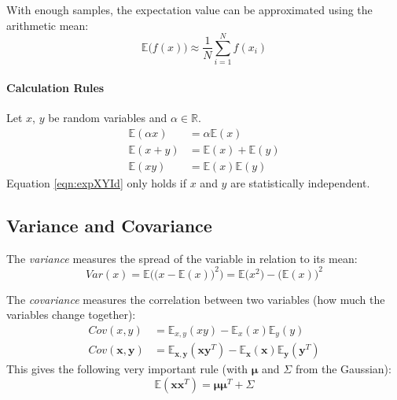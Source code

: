 \documentclass[a4paper, 11pt, accentcolor = tud3b]{tudreport}
\newcommand{\E}{\ensuremath{\mathbb{E}}}
\newcommand{\Cov}{\ensuremath{\textit{Cov}}}
\newcommand{\R}{\ensuremath{\mathbb{R}}}
\newcommand{\Var}{\ensuremath{\textit{Var}}}
\renewcommand{\vec}[1]{\mathbf{#1}}
\begin{document}
				With enough samples, the expectation value can be approximated using the arithmetic mean:
				\begin{equation}
					\E\big(f(x)\big) \approx \frac{1}{N} \sum_{i = 1}^{N} f(x_i)
				\end{equation}

				\paragraph{Calculation Rules}
					Let \(x\), \(y\) be random variables and \(\alpha \in \R\).
					\begin{align}
						\E(\alpha x) &= \alpha \E(x) \\
						\E(x + y) &= \E(x) + \E(y) \\
						\E(xy) &= \E(x) \E(y) \label{eqn:expXYId}
					\end{align}
					Equation \ref{eqn:expXYId} only holds if \(x\) and \(y\) are statistically independent.

			\subsection{Variance and Covariance}
				The \emph{variance} measures the spread of the variable in relation to its mean:
				\begin{equation}
					\Var(x) = \E\Big(\!\big( x - \E(x) \big)^2 \Big) = \E\big(x^2\big) - \big(\E(x)\big)^2
				\end{equation}

				The \emph{covariance} measures the correlation between two variables (how much the variables change together):
				\begin{align}
					\Cov(x, y) &= \E_{x,y}(xy) - \E_x(x) \E_y(y) \\
					\Cov(\vec{x}, \vec{y}) &= \E_{\vec{x},\vec{y}}(\vec{x}\vec{y}^T) - \E_{\vec{x}}(\vec{x}) \E_{\vec{y}}(\vec{y}^T)
				\end{align}
				This gives the following very important rule (with \(\vec{\mu}\) and \(\Sigma\) from the Gaussian):
				\begin{equation}
					\E(\vec{x}\vec{x}^T) = \vec{\mu}\vec{\mu}^T + \Sigma
				\end{equation}
\end{document}
